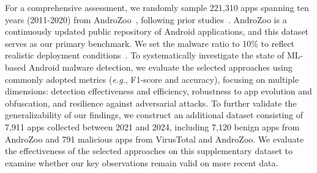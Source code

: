 For a comprehensive assessment, we randomly sample 221,310 apps spanning ten years (2011-2020) from AndroZoo~\cite{allix2016androzoo}, following prior studies~\cite{pendlebury2019tesseract,chen2023continuous}.
AndroZoo is a continuously updated public repository of Android applications, and this dataset serves as our primary benchmark.
We set the malware ratio to 10\% to reflect realistic deployment conditions~\cite{pendlebury2019tesseract}.
To systematically investigate the state of ML-based Android malware detection, we evaluate the selected approaches using commonly adopted metrics (\textit{e.g.}, F1-score and accuracy), focusing on multiple dimensions: detection effectiveness and efficiency, robustness to app evolution and obfuscation, and resilience against adversarial attacks.
To further validate the generalizability of our findings, we construct an additional dataset consisting of 7,911 apps collected between 2021 and 2024, including 7,120 benign apps from AndroZoo and 791 malicious apps from VirusTotal and AndroZoo.
We evaluate the effectiveness of the selected approaches on this supplementary dataset to examine whether our key observations remain valid on more recent data.

